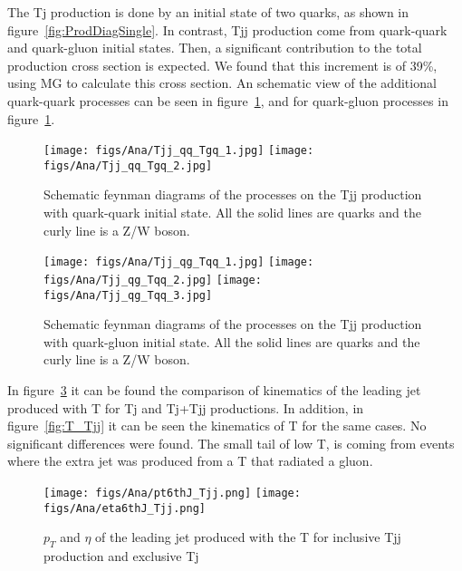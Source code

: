 The Tj production is done by an initial state of two quarks, as shown in figure~\ref{fig:ProdDiagSingle}. In contrast, Tjj production come from quark-quark and quark-gluon initial states. Then, a significant contribution to the total production cross section is expected. We found that this increment is of 39\%, using MG to calculate this cross section. An schematic view of the additional quark-quark processes can be seen in figure~\ref{fig:qqTjj}, and for quark-gluon processes in figure~\ref{fig:qqTjj}.

\begin{figure}[!hbtp]
  \begin{center}
    \texttt{[image: figs/Ana/Tjj\_qq\_Tgq\_1.jpg]}
    \texttt{[image: figs/Ana/Tjj\_qq\_Tgq\_2.jpg]}
    \caption{Schematic feynman diagrams of the processes on the Tjj production with quark-quark initial state. All the solid lines are quarks and the curly line is a Z/W boson.}
    \label{fig:qqTjj}
  \end{center}
\end{figure}

\begin{figure}[!hbtp]
  \begin{center}
    \texttt{[image: figs/Ana/Tjj\_qg\_Tqq\_1.jpg]}
    \texttt{[image: figs/Ana/Tjj\_qg\_Tqq\_2.jpg]}
    \texttt{[image: figs/Ana/Tjj\_qg\_Tqq\_3.jpg]}
    \caption{Schematic feynman diagrams of the processes on the Tjj production with quark-gluon initial state. All the solid lines are quarks and the curly line is a Z/W boson.}
    \label{fig:qgTjj}
  \end{center}
\end{figure}

In figure~\ref{fig:6thJ_Tjj} it can be found the comparison of kinematics of the leading jet produced with T for Tj and Tj+Tjj productions. In addition, in figure~\ref{fig:T_Tjj} it can be seen the kinematics of T for the same cases. No significant differences were found. The small tail of low \pt T, is coming from events where the extra jet was produced from a T that radiated a gluon. 

\begin{figure}[!hbtp]
  \begin{center}
    \texttt{[image: figs/Ana/pt6thJ\_Tjj.png]}
    \texttt{[image: figs/Ana/eta6thJ\_Tjj.png]}
    \caption{$p_{T}$ and $\eta$ of the leading jet produced with the T for inclusive Tjj production and exclusive Tj}
    \label{fig:6thJ_Tjj}
  \end{center}
\end{figure}

